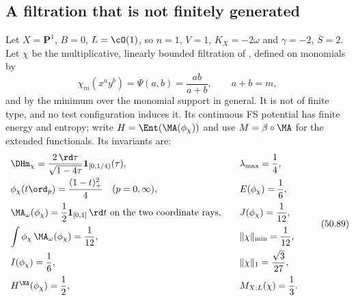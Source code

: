 \subsection{A filtration that is not finitely generated}
\label{sec:ch50-ex-harmonic}

\begin{example}
\label{ex:ch50-harmonic}
Let $X=\mathbf P^1$, $B=0$, $L=\cO(1)$, so $n=1$, $V=1$,
$K_X=-2\omega$ and $\gamma=-2$, $\overline S=2$.  Let $\chi$ be the
multiplicative, linearly bounded filtration of
, defined on monomials by
\[
 \chi_m(x^ay^{b})=\Psi(a,b)=\frac{ab}{a+b},\qquad a+b=m,
\]
and by the minimum over the monomial support in general.  It is not of
finite type, and no test configuration induces it.  Its continuous FS potential has
finite energy and entropy; write $H=\Ent(\MA(\phi_\chi))$ and use
$M=\beta\circ\MA$ for the extended functionals.  Its invariants are:
\[
 \begin{array}{ll}
 \DHm_\chi=\dfrac{2\,\rd\tau}{\sqrt{1-4\tau}}
     \mathbf 1_{[0,1/4)}(\tau),
 &\quad \lambda_{\max}=\dfrac14,\\[3mm]
 \phi_\chi(t\ord_p)=\dfrac{(1-t)_+^2}{4}\quad(p=0,\infty),
 &\quad E(\phi_\chi)=\dfrac16,\\[3mm]
 \MA_\omega(\phi_\chi)=\dfrac12\mathbf 1_{[0,1]}\,\rd t
       \ \text{on the two coordinate rays},
 &\quad J(\phi_\chi)=\dfrac1{12},\\[3mm]
 \displaystyle\int\phi_\chi\,\MA_\omega(\phi_\chi)=\dfrac1{12},
 &\quad \|\chi\|_{\min}=\dfrac1{12},\\[3mm]
 I(\phi_\chi)=\dfrac16,
 &\quad \|\chi\|_1=\dfrac{\sqrt3}{27},\\[3mm]
 H^{\NA}(\phi_\chi)=\dfrac12,
 &\quad M_{X;L}(\chi)=\dfrac13 .
 \end{array}
\tag{50.89}\label{eq:ch50-harmonic-table}
\]
\end{example}

